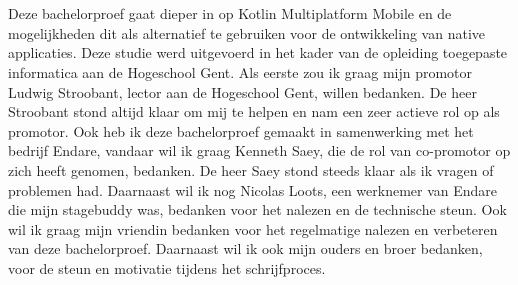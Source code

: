 
\chapter*{}
\label{ch:voorwoord}


Deze bachelorproef gaat dieper in op Kotlin Multiplatform Mobile en de mogelijkheden dit als alternatief te gebruiken voor de ontwikkeling van native applicaties. Deze studie werd uitgevoerd in het kader van de opleiding toegepaste informatica aan de Hogeschool Gent. Als eerste zou ik graag mijn promotor Ludwig Stroobant, lector aan de Hogeschool Gent, willen bedanken. De heer Stroobant stond altijd klaar om mij te helpen en nam een zeer actieve rol op als promotor. Ook heb ik deze bachelorproef gemaakt in samenwerking met het bedrijf Endare, vandaar wil ik graag Kenneth Saey, die de rol van co-promotor op zich heeft genomen, bedanken. De heer Saey stond steeds klaar als ik vragen of problemen had. Daarnaast wil ik nog Nicolas Loots, een werknemer van Endare die mijn stagebuddy was, bedanken voor het nalezen en de technische steun. Ook wil ik graag mijn vriendin bedanken voor het regelmatige nalezen en verbeteren van deze bachelorproef. Daarnaast wil ik ook mijn ouders en broer bedanken, voor de steun en motivatie tijdens het schrijfproces.